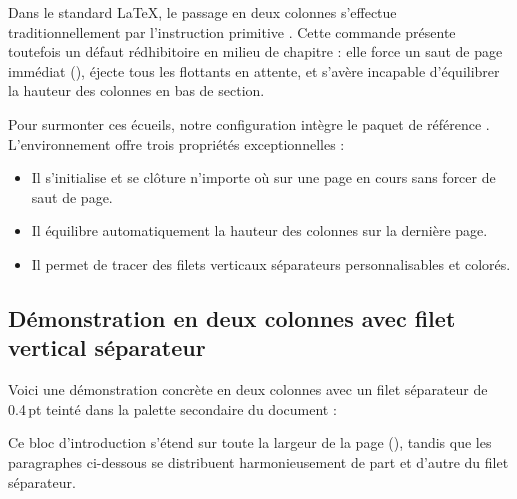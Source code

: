 Dans le standard \LaTeX{}, le passage en deux colonnes s'effectue traditionnellement
par l'instruction primitive .
Cette commande présente toutefois un défaut rédhibitoire en milieu de chapitre :
elle force un saut de page immédiat (),
éjecte tous les flottants en attente,
et s'avère incapable d'équilibrer la hauteur des colonnes en bas de section.

Pour surmonter ces écueils, notre configuration intègre le paquet de référence .
L'environnement  offre trois propriétés exceptionnelles :
\begin{itemize}
  \item Il s'initialise et se clôture n'importe où sur une page en cours sans forcer de saut de page.
  \item Il équilibre automatiquement la hauteur des colonnes sur la dernière page.
  \item Il permet de tracer des filets verticaux séparateurs personnalisables et colorés.
\end{itemize}

\subsection{Démonstration en deux colonnes avec filet vertical séparateur}

Voici une démonstration concrète en deux colonnes avec un filet séparateur
de 0.4\,pt teinté dans la palette secondaire du document :

\setlength{\columnseprule}{0.4pt}
\renewcommand{\columnseprulecolor}{\color{ThesisSecondary!40}}
\setlength{\columnsep}{20pt}

\begin{callout}
Ce bloc d'introduction s'étend sur toute la largeur de la page (),
tandis que les paragraphes ci-dessous se distribuent harmonieusement de part et d'autre du filet séparateur.
\end{callout}

